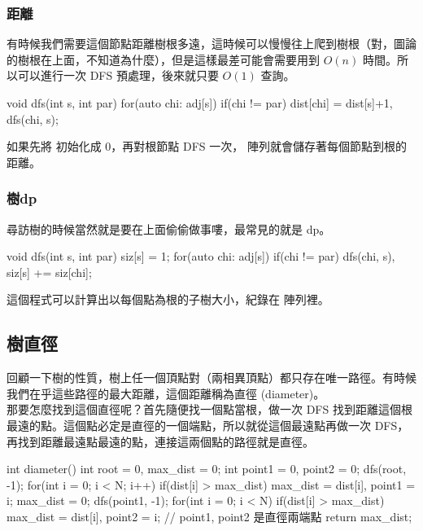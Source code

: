 \subsubsection{距離}

有時候我們需要這個節點距離樹根多遠，這時候可以慢慢往上爬到樹根（對，圖論的樹根在上面，不知道為什麼），但是這樣最差可能會需要用到 $O(n)$ 時間。所以可以進行一次 DFS 預處理，後來就只要 $O(1)$ 查詢。

\begin{C++}
void dfs(int s, int par){
	for(auto chi: adj[s]){
		if(chi != par) dist[chi] = dist[s]+1, dfs(chi, s);
	}
}
\end{C++}

如果先將  初始化成 $0$，再對根節點 DFS 一次， 陣列就會儲存著每個節點到根的距離。

\subsubsection{樹dp}
尋訪樹的時候當然就是要在上面偷偷做事嘍，最常見的就是 dp。\\

\begin{C++}
void dfs(int s, int par){
	siz[s] = 1;
	for(auto chi: adj[s]){
		if(chi != par) dfs(chi, s), siz[s] += siz[chi];
	}
}
\end{C++}

這個程式可以計算出以每個點為根的子樹大小，紀錄在  陣列裡。

\subsection{樹直徑}
回顧一下樹的性質，樹上任一個頂點對（兩相異頂點）都只存在唯一路徑。有時候我們在乎這些路徑的最大距離，這個距離稱為直徑 (diameter)。\\

那要怎麼找到這個直徑呢？首先隨便找一個點當根，做一次 DFS 找到距離這個根最遠的點。這個點必定是直徑的一個端點，所以就從這個最遠點再做一次 DFS，再找到距離最遠點最遠的點，連接這兩個點的路徑就是直徑。

\begin{C++}
int diameter(){
    int root = 0, max_dist = 0;
    int point1 = 0, point2 = 0;
    dfs(root, -1);
    for(int i = 0; i < N; i++)
        if(dist[i] > max_dist){
            max_dist = dist[i], point1 = i;
        }
    max_dist = 0;
    dfs(point1, -1);
    for(int i = 0; i < N)
        if(dist[i] > max_dist){
            max_dist = dist[i], point2 = i;
        }
    // point1, point2 是直徑兩端點
    return max_dist;
}
\end{C++}

